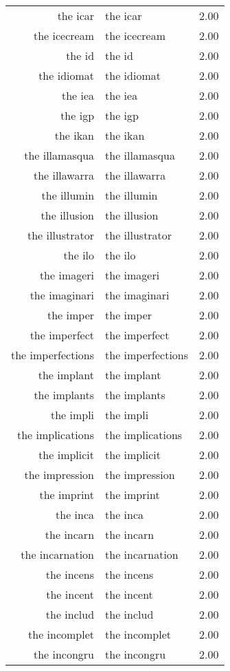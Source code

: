 \begin{table}[ht]
\begin{tabular}{rlr}
  the icar & the icar & 2.00 \\ 
  the icecream & the icecream & 2.00 \\ 
  the id & the id & 2.00 \\ 
  the idiomat & the idiomat & 2.00 \\ 
  the iea & the iea & 2.00 \\ 
  the igp & the igp & 2.00 \\ 
  the ikan & the ikan & 2.00 \\ 
  the illamasqua & the illamasqua & 2.00 \\ 
  the illawarra & the illawarra & 2.00 \\ 
  the illumin & the illumin & 2.00 \\ 
  the illusion & the illusion & 2.00 \\ 
  the illustrator & the illustrator & 2.00 \\ 
  the ilo & the ilo & 2.00 \\ 
  the imageri & the imageri & 2.00 \\ 
  the imaginari & the imaginari & 2.00 \\ 
  the imper & the imper & 2.00 \\ 
  the imperfect & the imperfect & 2.00 \\ 
  the imperfections & the imperfections & 2.00 \\ 
  the implant & the implant & 2.00 \\ 
  the implants & the implants & 2.00 \\ 
  the impli & the impli & 2.00 \\ 
  the implications & the implications & 2.00 \\ 
  the implicit & the implicit & 2.00 \\ 
  the impression & the impression & 2.00 \\ 
  the imprint & the imprint & 2.00 \\ 
  the inca & the inca & 2.00 \\ 
  the incarn & the incarn & 2.00 \\ 
  the incarnation & the incarnation & 2.00 \\ 
  the incens & the incens & 2.00 \\ 
  the incent & the incent & 2.00 \\ 
  the includ & the includ & 2.00 \\ 
  the incomplet & the incomplet & 2.00 \\ 
  the incongru & the incongru & 2.00 \\ 

\end{tabular}
\end{table}

